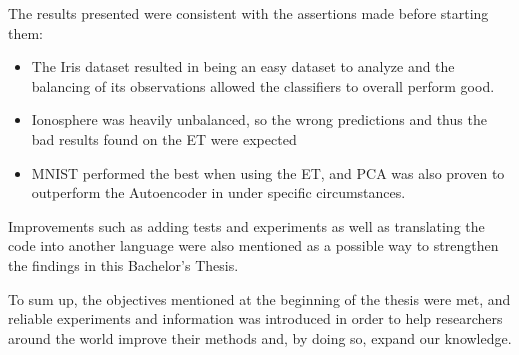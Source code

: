 The results presented were consistent with the assertions made before starting them:
\begin{itemize}
	\item The Iris dataset resulted in being an easy dataset to analyze and the balancing of its observations allowed the classifiers to overall perform good.
	
	\item Ionosphere was heavily unbalanced, so the wrong predictions and thus the bad results found on the ET were expected
	
	\item MNIST performed the best when using the ET, and PCA was also proven to outperform the Autoencoder in under specific circumstances.
	
\end{itemize}

Improvements such as adding tests and experiments as well as translating the code into another language were also mentioned as a possible way to strengthen the findings in this Bachelor's Thesis. \par

To sum up, the objectives mentioned at the beginning of the thesis were met, and reliable experiments and information was introduced in order to help researchers around the world improve their methods and, by doing so, expand our knowledge.